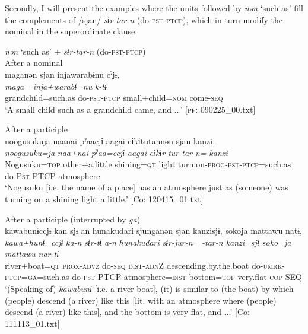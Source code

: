   Secondly, I will present the examples where the units followed by \textit{nən} ‘such as’ fill the complements of /sjan/ \textit{sɨr-tar-n} (do-\textsc{pst}-\textsc{ptcp}), which in turn modify the nominal in the superordinate clause.

\ea\label{ex:10.86}   \textit{nən} ‘such as’ + \textit{sɨr-tar-n} (do-\textsc{pst}-\textsc{ptcp})\\
  \ea After a nominal\\
      \glll    maganən  sjan  injawarabɨnu  cˀjɨ,\\
    \textit{maga=}  \textit{}  \textit{inja+warabɨ=nu}  \textit{k-tɨ}\\
    grandchild=such.as  do-\textsc{pst}-\textsc{ptcp}  small+child=\textsc{nom}  come-\textsc{seq}\\
    \glt     ‘A small child such as a grandchild came, and ...’ [\textsc{pf}: 090225\_00.txt]

  \ex After a participle\\

      \glll    noogusukuja  naanai  pˀaacjɨ  aagai  cɨkɨtutannən  sjan  {\textbar}kanzi{\textbar}.\\
    \textit{noogusuku=ja}  \textit{naa+nai}  \textit{pˀaa=ccjɨ}  \textit{aagai}  \textit{cɨkɨr-tur-tar-n=}  \textit{}  \textit{kanzi}\\
    Nogusuku=\textsc{top}  other+a.little  shining=\textsc{qt}  light turn.on-\textsc{prog}-\textsc{pst}-\textsc{ptcp}=such.as  do-P\textsc{st}-PTCP  atmosphere\\
\glt     ‘Nogusuku [i.e. the name of a place] has an atmosphere just as (someone) was turning on a shining light a little.’  [Co: 120415\_01.txt]

  \ex After a participle (interrupted by \textit{ga})\\

      \glll    {\textbar}kawa{\textbar}bunɨccjɨ  kan  sjɨ  an  {\textbar}hunakudari{\textbar}  sjunganən  sjan  {\textbar}kanzi{\textbar}sjɨ,  {\textbar}soko{\textbar}ja   mattawu  natɨ,\\
    \textit{kawa+hunɨ=ccjɨ}  \textit{ka-n}  \textit{sɨr-tɨ}  \textit{a-n}  \textit{hunakudari}  \textit{sɨr-jur-n=}  \textit{-tar-n  kanzi=sjɨ  soko=ja}  \textit{mattawu}  \textit{nar-tɨ}\\
    river+boat=\textsc{qt}  \textsc{prox}-\textsc{advz}  do-\textsc{seq}  \textsc{dist}-\textsc{adn}Z  descending.by.the.boat do-\textsc{umrk}-\textsc{ptcp}=\textsc{ga}=such.as  do-\textsc{pst}-PTCP  atmosphere=\textsc{inst}  bottom=\textsc{top}  very.flat  \textsc{cop}-SEQ    \\
    \glt     ‘(Speaking of) \textit{kawabunɨ} [i.e. a river boat], (it) is similar to (the boat) by which (people) descend (a river) like this [lit. with an atmosphere where (people) descend (a river) like this], and the bottom is very flat, and ...’  [Co: 111113\_01.txt]
    \z
\z

